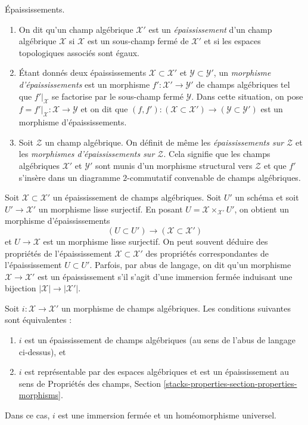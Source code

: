 \begin{definition}
\label{definition-thickening}
Épaississements.
\begin{enumerate}
\item On dit qu'un champ algébrique $\mathcal{X}'$ est un {\it épaississement}
d'un champ algébrique $\mathcal{X}$ si $\mathcal{X}$ est un sous-champ fermé
de $\mathcal{X}'$ et si les espaces topologiques associés sont égaux.
\item Étant donnés deux épaississements $\mathcal{X} \subset \mathcal{X}'$ et
$\mathcal{Y} \subset \mathcal{Y}'$, un {\it morphisme d'épaississements}
est un morphisme $f' : \mathcal{X}' \to \mathcal{Y}'$ de champs algébriques
tel que $f'|_\mathcal{X}$ se factorise par le
sous-champ fermé $\mathcal{Y}$. Dans cette situation, on pose
$f = f'|_\mathcal{X} : \mathcal{X} \to \mathcal{Y}$ et on dit que
$(f, f') : (\mathcal{X} \subset \mathcal{X}') \to
(\mathcal{Y} \subset \mathcal{Y}')$ est un morphisme d'épaississements.
\item Soit $\mathcal{Z}$ un champ algébrique. On définit de même les
{\it épaississements sur $\mathcal{Z}$} et les
{\it morphismes d'épaississements sur $\mathcal{Z}$}.
Cela signifie que les champs algébriques
$\mathcal{X}'$ et $\mathcal{Y}'$
sont munis d'un
morphisme structural vers $\mathcal{Z}$ et que $f'$ s'insère dans un
diagramme $2$-commutatif convenable de champs algébriques.
\end{enumerate}
\end{definition}

\noindent
Soit $\mathcal{X} \subset \mathcal{X}'$ un épaississement de champs algébriques.
Soit $U'$ un schéma et soit $U' \to \mathcal{X}'$ un morphisme lisse
surjectif. En posant $U = \mathcal{X} \times_{\mathcal{X}'} U'$, on obtient
un morphisme d'épaississements
$$
(U \subset U') \longrightarrow (\mathcal{X} \subset \mathcal{X}')
$$
et $U \to \mathcal{X}$ est un morphisme lisse surjectif. On peut souvent
déduire des propriétés de l'épaississement $\mathcal{X} \subset \mathcal{X}'$
des propriétés correspondantes de l'épaississement $U \subset U'$.
Parfois, par abus de langage, on dit qu'un morphisme
$\mathcal{X} \to \mathcal{X}'$ est un épaississement s'il s'agit d'une immersion
fermée induisant une bijection $|\mathcal{X}| \to |\mathcal{X}'|$.

\begin{lemma}
\label{lemma-thickening}
Soit $i : \mathcal{X} \to \mathcal{X}'$ un morphisme de champs algébriques.
Les conditions suivantes sont équivalentes :
\begin{enumerate}
\item $i$ est un épaississement de champs algébriques (au sens de l'abus de langage ci-dessus), et
\item $i$ est représentable par des espaces algébriques et
est un épaississement au sens de Propriétés des champs, Section
\ref{stacks-properties-section-properties-morphisms}.
\end{enumerate}
Dans ce cas, $i$ est une immersion fermée et un homéomorphisme universel.
\end{lemma}

